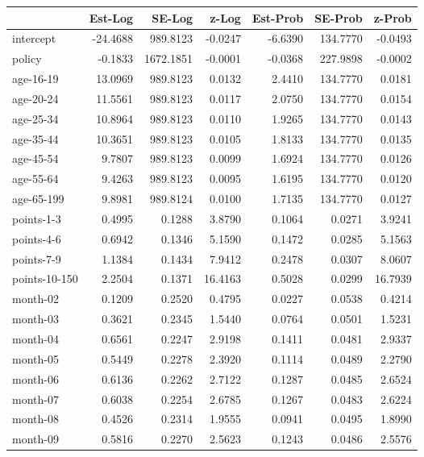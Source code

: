 \documentclass[10pt]{article}
\begin{document}
\begin{table}[ht]
\centering
\begin{tabular}{lrrrrrr}
  \hline
 & Est-Log & SE-Log & z-Log & Est-Prob & SE-Prob & z-Prob \\ 
  \hline
intercept & -24.4688 & 989.8123 & -0.0247 & -6.6390 & 134.7770 & -0.0493 \\ 
  policy & -0.1833 & 1672.1851 & -0.0001 & -0.0368 & 227.9898 & -0.0002 \\ 
  age-16-19 & 13.0969 & 989.8123 & 0.0132 & 2.4410 & 134.7770 & 0.0181 \\ 
  age-20-24 & 11.5561 & 989.8123 & 0.0117 & 2.0750 & 134.7770 & 0.0154 \\ 
  age-25-34 & 10.8964 & 989.8123 & 0.0110 & 1.9265 & 134.7770 & 0.0143 \\ 
  age-35-44 & 10.3651 & 989.8123 & 0.0105 & 1.8133 & 134.7770 & 0.0135 \\ 
  age-45-54 & 9.7807 & 989.8123 & 0.0099 & 1.6924 & 134.7770 & 0.0126 \\ 
  age-55-64 & 9.4263 & 989.8123 & 0.0095 & 1.6195 & 134.7770 & 0.0120 \\ 
  age-65-199 & 9.8981 & 989.8124 & 0.0100 & 1.7135 & 134.7770 & 0.0127 \\ 
  points-1-3 & 0.4995 & 0.1288 & 3.8790 & 0.1064 & 0.0271 & 3.9241 \\ 
  points-4-6 & 0.6942 & 0.1346 & 5.1590 & 0.1472 & 0.0285 & 5.1563 \\ 
  points-7-9 & 1.1384 & 0.1434 & 7.9412 & 0.2478 & 0.0307 & 8.0607 \\ 
  points-10-150 & 2.2504 & 0.1371 & 16.4163 & 0.5028 & 0.0299 & 16.7939 \\ 
  month-02 & 0.1209 & 0.2520 & 0.4795 & 0.0227 & 0.0538 & 0.4214 \\ 
  month-03 & 0.3621 & 0.2345 & 1.5440 & 0.0764 & 0.0501 & 1.5231 \\ 
  month-04 & 0.6561 & 0.2247 & 2.9198 & 0.1411 & 0.0481 & 2.9337 \\ 
  month-05 & 0.5449 & 0.2278 & 2.3920 & 0.1114 & 0.0489 & 2.2790 \\ 
  month-06 & 0.6136 & 0.2262 & 2.7122 & 0.1287 & 0.0485 & 2.6524 \\ 
  month-07 & 0.6038 & 0.2254 & 2.6785 & 0.1267 & 0.0483 & 2.6224 \\ 
  month-08 & 0.4526 & 0.2314 & 1.9555 & 0.0941 & 0.0495 & 1.8990 \\ 
  month-09 & 0.5816 & 0.2270 & 2.5623 & 0.1243 & 0.0486 & 2.5576 \\ 

\end{tabular}
\end{table}
\end{document}
